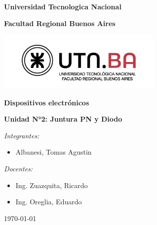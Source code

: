 \documentclass[main.tex]{subfiles}
\begin{document}
	
	\onecolumn
	
	\begin{center}
		\textbf{\fontsize{14}{\baselineskip}\selectfont Universidad Tecnologica Nacional}
		
		\bigskip
		
		\textbf{\fontsize{14}{\baselineskip}\selectfont Facultad Regional Buenos Aires}
		
		\bigskip
		
		\includegraphics[width=8cm]{utn-logo.jpg}
		
		\bigskip
		
		\textbf{\fontsize{20}{\baselineskip}\selectfont Dispositivos electrónicos}
		
		\bigskip
		
		\textbf{\fontsize{18}{\baselineskip}\selectfont Unidad N°2: Juntura PN y Diodo}
		
		\bigskip
		\bigskip
		\bigskip
		
		\textit{\fontsize{14}{\baselineskip}\selectfont Integrantes:}
		
		\bigskip
		
		\begin{itemize}{}
			\item \fontsize{14}{\baselineskip}\selectfont Albanesi, Tomas Agustin
		\end{itemize}
		
		\bigskip
		\bigskip
		
		\textit{\fontsize{14}{\baselineskip}\selectfont Docentes:}
		
		\bigskip
		
		\begin{itemize}
			\item \fontsize{14}{\baselineskip}\selectfont Ing. Zuazquita, Ricardo
			\item \fontsize{14}{\baselineskip}\selectfont Ing. Oreglia, Eduardo
		\end{itemize}
		
		\bigskip
		\bigskip
		
		{\today}
		
	\end{center}
	
	\clearpage
	
\end{document}
